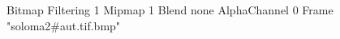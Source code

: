 {Bitmap
	{Filtering 1}
	{Mipmap 1}
	{Blend none}
	{AlphaChannel 0}
	{Frame "soloma2#aut.tif.bmp"}
}
